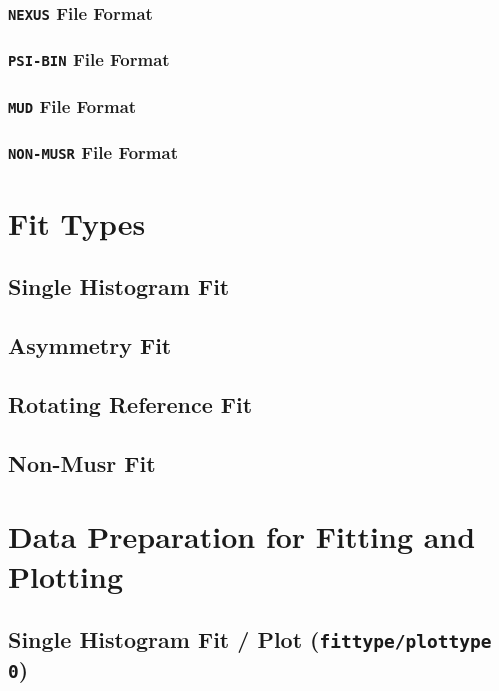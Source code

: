 \documentclass[twoside]{article}
\begin{document}
\subsubsection{\texttt{NEXUS} File Format}\label{subsubsec:nexus-format}%
\subsubsection{\texttt{PSI-BIN} File Format}\label{subsubsec:psibin-format}%
\subsubsection{\texttt{MUD} File Format}\label{subsubsec:mud-format}%
\subsubsection{\texttt{NON-MUSR} File Format}\label{subsubsec:non-musr-format}%

\section{Fit Types}\label{sec:fit-types}%

\subsection{Single Histogram Fit}\label{subsec:single-histogram-fit}%
\subsection{Asymmetry Fit}\label{subsec:asymmetry-fit}%
\subsection{Rotating Reference Fit}\label{subsec:rrf}%
\subsection{Non-Musr Fit}\label{subsec:non-musr-fit}%

\section{Data Preparation for Fitting and Plotting}\label{sec:data-preparation}%

\subsection{Single Histogram Fit / Plot (\texttt{fittype/plottype 0})}\label{subsec:single-histo-fit-plot}%
\end{document}
